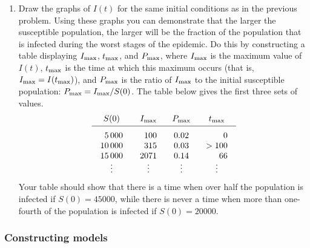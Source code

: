 \begin{enumerate}
\item Draw the graphs of $I(t)$ for the same initial conditions as in
the previous problem.  Using these graphs you can demonstrate that the
larger the susceptible population, the larger will be the fraction of
the population that is infected during the worst stages of the
epidemic.  Do this by constructing a table displaying $I_{\mbox{\scriptsize max}}$,
$t_{\mbox{\scriptsize max}}$, and $P_{\mbox{\scriptsize max}}$, where $I_{\mbox{\scriptsize max}}$ is the maximum value
of $I(t)$, $t_{\mbox{\scriptsize max}}$ is the time at which this maximum occurs (that
is, $I_{\mbox{\scriptsize max}} = I(t_{\mbox{\scriptsize max}})$), and $P_{\mbox{\scriptsize max}}$ is the ratio of
$I_{\mbox{\scriptsize max}}$ to the initial susceptible population:
$P_{\mbox{\scriptsize max}}=I_{\mbox{\scriptsize max}}/S(0)$.  The table below gives the first three
sets of values.  \addtolength{\arraycolsep}{3pt}
	\[
\begin{array}{cccc}
	S(0) & I_{\smax} & P_{\smax} & t_{\smax} \\[2pt] \hline
	\begin{array}{r}
	\rule{0pt}{14pt} 5\,000 \\ 10\,000 \\ 15\,000 
	\end{array}
	&
	\begin{array}{r}
	\rule{0pt}{14pt} 100 \\ 315 \\ 2071 
	\end{array}
	&
	\begin{array}{r}
	\rule{0pt}{14pt} 0.02 \\ 0.03 \\ 0.14 
	\end{array}
	&
	\begin{array}{r}
	\rule{0pt}{14pt} 0 \\ >100 \\ 66 
	\end{array}
	\\[-2pt]
	\vdots & \vdots & \vdots & \vdots 
\end{array}
\] 
\addtolength{\arraycolsep}{-3pt}%
Your table should show that there is a time when over half the
population is infected if $S(0) = 45000$, while there is never a time
when more than one-fourth of the population is infected if $S(0) =
20000$.


\end{enumerate}
\subsubsection{Constructing models}
\label{subsubsec:constructing-models}

